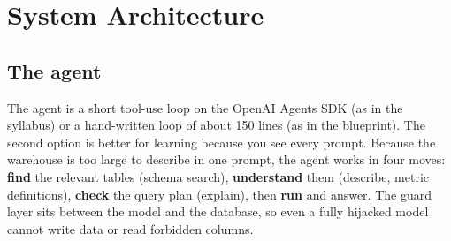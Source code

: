\documentclass[11pt,a4paper]{article}
\begin{document}
\section{System Architecture}

\subsection{The agent}

The agent is a short tool-use loop on the OpenAI Agents SDK (as in the syllabus) or a
hand-written loop of about 150 lines (as in the blueprint). The second option is better for
learning because you see every prompt. Because the warehouse is too large to describe in one
prompt, the agent works in four moves: \textbf{find} the relevant tables (schema search),
\textbf{understand} them (describe, metric definitions), \textbf{check} the query plan (explain),
then \textbf{run} and answer. The guard layer sits between the model and the database, so even
a fully hijacked model cannot write data or read forbidden columns.
\end{document}

